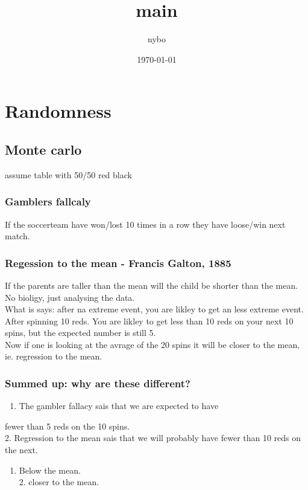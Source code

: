 \documentclass[a4paper,12pt]{article}
\author{nybo}
\date{\today}
\title{main}
\begin{document}
\maketitle
\tableofcontents

\newpage
\section{Randomness}
\label{sec-1}


\subsection{Monte carlo}
\label{sec-1-1}
assume table with 50/50 red black
\subsubsection{Gamblers fallcaly}
\label{sec-1-1-1}
If the soccerteam have won/lost 10 times in a row
 they have loose/win next match. 


\subsubsection{Regession to the mean - Francis Galton, 1885}
\label{sec-1-1-2}
If the parents are taller than the mean will the child 
be shorter than the mean. No bioligy, just analysing the 
data.\\
What is says: after na extreme event, you are likley to
 get an less extreme event. After spinning 10 reds. You 
are likley to get less than 10 reds on your next 
10 spins, but the expected number is still 5. \\
Now if one is looking at the avrage of the 20 
spins it will be closer to the mean, ie. 
regression to the mean. 



\subsubsection{Summed up: why are these different?}
\label{sec-1-1-3}
\begin{enumerate}
\item The gambler fallacy sais that we are expected to have
\end{enumerate}
fewer than 5 reds on the 10 spins. \\ 2. Regression to the mean
 sais that we will probably have fewer than 10 reds on the next. \\
\begin{enumerate}
\item Below the mean. \\ 2. closer to the mean.
\end{enumerate}
\end{document}

